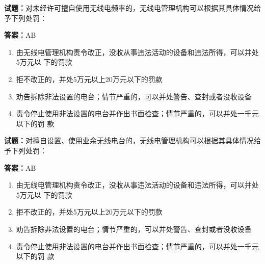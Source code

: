 \documentclass{ctexbook}
\begin{document}




\vspace{1em}

\textbf{试题：}对未经许可擅自使用无线电频率的，无线电管理机构可以根据其具体情况给予下列处罚： 

\textbf{答案：}AB 

\begin{enumerate}[leftmargin=3em]
  \item 由无线电管理机构责令改正，没收从事违法活动的设备和违法所得，可以并处5万元以
下的罚款 

  \item 拒不改正的，并处5万元以上20万元以下的罚款 

  \item 劝告拆除非法设置的电台；情节严重的，可以并处警告、查封或者没收设备 


  \item 责令停止使用非法设置的电台并作出书面检查；情节严重的，可以并处一千元以下的罚
款 

\end{enumerate}





\vspace{1em}

\textbf{试题：}对擅自设置、使用业余无线电台的，无线电管理机构可以根据其具体情况给予下列处罚： 

\textbf{答案：}AB 

\begin{enumerate}[leftmargin=3em]
  \item 由无线电管理机构责令改正，没收从事违法活动的设备和违法所得，可以并处5万元以
下的罚款 

  \item 拒不改正的，并处5万元以上20万元以下的罚款 

  \item 劝告拆除非法设置的电台；情节严重的，可以并处警告、查封或者没收设备 

  \item 责令停止使用非法设置的电台并作出书面检查；情节严重的，可以并处一千元以下的罚
款 

\end{enumerate}


\end{document}
